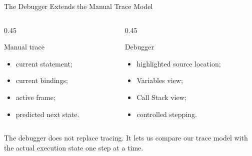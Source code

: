 \documentclass[aspectratio=169,10pt]{beamer}
\begin{document}

\begin{frame}{The Debugger Extends the Manual Trace Model}
  \begin{columns}[T,onlytextwidth]
    \begin{column}{0.45\textwidth}
      \begin{block}{Manual trace}
        \begin{itemize}
          \item current statement;
          \item current bindings;
          \item active frame;
          \item predicted next state.
        \end{itemize}
      \end{block}
    \end{column}

    \begin{column}{0.45\textwidth}
      \begin{block}{Debugger}
        \begin{itemize}
          \item highlighted source location;
          \item Variables view;
          \item Call Stack view;
          \item controlled stepping.
        \end{itemize}
      \end{block}
    \end{column}
  \end{columns}

  \begin{keyidea}
    The debugger does not replace tracing. It lets us compare our trace model with the actual execution state one step at a time.
  \end{keyidea}
\end{frame}
\end{document}

